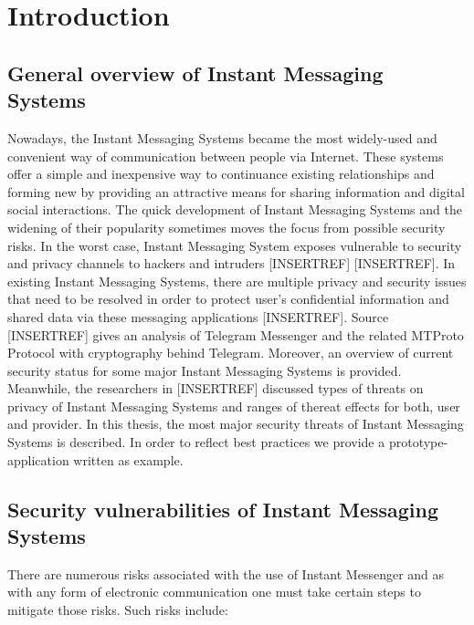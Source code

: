 \chapter{Introduction}\label{ch:introduction}


\newcommand{\keyword}[1]{\textbf{#1}}
\newcommand{\tabhead}[1]{\textbf{#1}}
\newcommand{\code}[1]{\texttt{#1}}
\newcommand{\file}[1]{\texttt{\bfseries#1}}
\newcommand{\option}[1]{\texttt{\itshape#1}}



\section{General overview of Instant Messaging Systems}\label{sec:general-overview-of-im-system}
Nowadays, the Instant Messaging Systems became the most widely-used and convenient way of communication between
people via Internet.
These systems offer a simple and inexpensive way to continuance existing relationships and forming new by providing an
attractive means for sharing information and digital social interactions.
The quick development of Instant Messaging Systems and the widening of their popularity sometimes moves the focus from possible security risks.
In the worst case, Instant Messaging System exposes vulnerable to security and privacy channels to hackers and intruders [INSERTREF] [INSERTREF].
In existing Instant Messaging Systems, there are multiple privacy and security issues that need to be resolved in order to protect user's confidential
information and shared data via these messaging applications [INSERTREF].
Source [INSERTREF] gives an analysis of Telegram Messenger and the related MTProto Protocol with cryptography
behind Telegram.
Moreover, an overview of current security status for some major Instant Messaging Systems is provided.
Meanwhile, the researchers in [INSERTREF] discussed types of threats on privacy of Instant Messaging Systems
and ranges of thereat effects for both, user and provider.
In this thesis, the most major security threats of Instant Messaging Systems is described.
In order to reflect best practices we provide a prototype-application written as example.


\section{Security vulnerabilities of Instant Messaging Systems}\label{sec:security-vulnerabilities-of-instant-messaging-systems}
There are numerous risks associated with the use of Instant Messenger and as with any form of electronic communication
one must take certain steps to mitigate those risks.
Such risks include:

